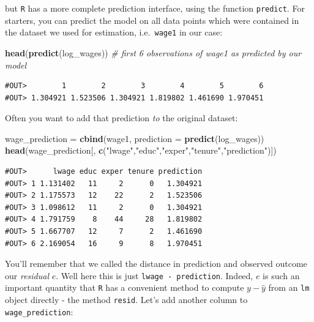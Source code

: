 \documentclass[]{book}
\newenvironment{Shaded}{\begin{snugshade}}{\end{snugshade}}
\newcommand{\CommentTok}[1]{\textcolor[rgb]{0.56,0.35,0.01}{\textit{#1}}}
\newcommand{\DataTypeTok}[1]{\textcolor[rgb]{0.13,0.29,0.53}{#1}}
\newcommand{\KeywordTok}[1]{\textcolor[rgb]{0.13,0.29,0.53}{\textbf{#1}}}
\newcommand{\NormalTok}[1]{#1}
\newcommand{\StringTok}[1]{\textcolor[rgb]{0.31,0.60,0.02}{#1}}
\begin{document}
but \texttt{R} has a more complete prediction interface, using the function \texttt{predict}. For starters, you can predict the model on all data points which were contained in the dataset we used for estimation, i.e.~\texttt{wage1} in our case:

\begin{Shaded}
\begin{Highlighting}[]
\KeywordTok{head}\NormalTok{(}\KeywordTok{predict}\NormalTok{(log_wages))  }\CommentTok{# first 6 observations of wage1 as predicted by our model}
\end{Highlighting}
\end{Shaded}

\begin{verbatim}
#OUT>        1        2        3        4        5        6 
#OUT> 1.304921 1.523506 1.304921 1.819802 1.461690 1.970451
\end{verbatim}

Often you want to add that prediction \emph{to} the original dataset:

\begin{Shaded}
\begin{Highlighting}[]
\NormalTok{wage_prediction =}\StringTok{ }\KeywordTok{cbind}\NormalTok{(wage1, }\DataTypeTok{prediction =} \KeywordTok{predict}\NormalTok{(log_wages))}
\KeywordTok{head}\NormalTok{(wage_prediction[, }\KeywordTok{c}\NormalTok{(}\StringTok{"lwage"}\NormalTok{,}\StringTok{"educ"}\NormalTok{,}\StringTok{"exper"}\NormalTok{,}\StringTok{"tenure"}\NormalTok{,}\StringTok{"prediction"}\NormalTok{)])}
\end{Highlighting}
\end{Shaded}

\begin{verbatim}
#OUT>      lwage educ exper tenure prediction
#OUT> 1 1.131402   11     2      0   1.304921
#OUT> 2 1.175573   12    22      2   1.523506
#OUT> 3 1.098612   11     2      0   1.304921
#OUT> 4 1.791759    8    44     28   1.819802
#OUT> 5 1.667707   12     7      2   1.461690
#OUT> 6 2.169054   16     9      8   1.970451
\end{verbatim}

You'll remember that we called the distance in prediction and observed outcome our \emph{residual} \(e\). Well here this is just \texttt{lwage\ -\ prediction}. Indeed, \(e\) is such an important quantity that \texttt{R} has a convenient method to compute \(y - \hat{y}\) from an \texttt{lm} object directly - the method \texttt{resid}. Let's add another column to \texttt{wage\_prediction}:
\end{document}
